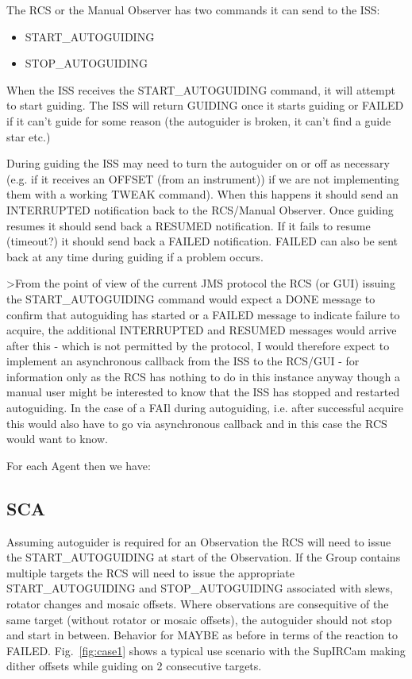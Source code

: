 \documentclass{article}
\begin{document}
The RCS or the Manual Observer has two commands
it can send to the ISS:

\begin{itemize}
\item START\_AUTOGUIDING
\item STOP\_AUTOGUIDING
\end{itemize}

When the ISS receives the START\_AUTOGUIDING command,
it will attempt to start guiding.  The ISS will
return GUIDING once it starts guiding or
FAILED if it can't guide for some reason (the
autoguider is broken, it can't find a guide star
etc.)  

During guiding the ISS may need to turn the autoguider on or
off as necessary (e.g. if it receives an OFFSET (from an instrument)) 
if we are not implementing them with a working TWEAK command).  
When this happens it should send an INTERRUPTED notification back to the
RCS/Manual Observer.  Once guiding resumes it should
send back a RESUMED notification.  If it fails to resume (timeout?)
it should send back a FAILED notification.  FAILED can also be
sent back at any time during guiding if a problem occurs.
 
>From the point of view of the current JMS protocol the RCS (or GUI) issuing the
START\_AUTOGUIDING command would expect a DONE message to confirm that autoguiding has started
or a FAILED message to indicate failure to acquire, the additional INTERRUPTED and RESUMED
messages would arrive after this - which is not permitted by the protocol, I would therefore
expect to implement an asynchronous callback from the ISS to the RCS/GUI - for information only
as the RCS has nothing to do in this instance anyway though a manual user might be interested
to know that the ISS has stopped and restarted autoguiding. In the case of a FAIl during autoguiding,
i.e. after successful acquire this would also have to go via asynchronous callback and in this case the
RCS would want to know.


For each Agent then we have:

\subsection{SCA}

Assuming autoguider is required for an {\rm Observation} the RCS will need to issue the START\_AUTOGUIDING at start of the {\rm Observation}.  If the {\rm Group} contains multiple targets the RCS will need to issue the appropriate START\_AUTOGUIDING and STOP\_AUTOGUIDING associated with slews, rotator changes and mosaic offsets.  
Where observations are consequitive of the same target (without rotator or mosaic offsets), the autoguider should not stop and start in between.  Behavior for MAYBE as before in terms of the reaction to FAILED. Fig.~\ref{fig:case1} shows a typical use scenario with the SupIRCam making dither offsets while guiding on 2 consecutive targets.
\end{document}
